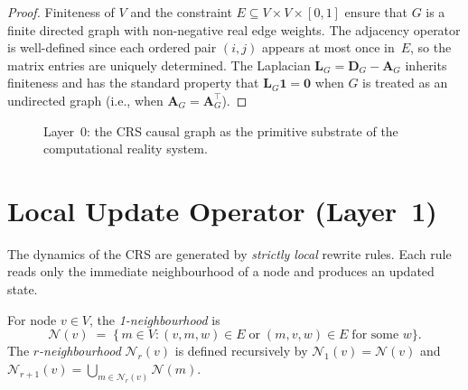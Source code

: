 \begin{proof}
Finiteness of $V$ and the constraint $E \subseteq V \times V \times
[0,1]$ ensure that $G$ is a finite directed graph with non-negative
real edge weights.  The adjacency operator is well-defined since each
ordered pair $(i,j)$ appears at most once in~$E$, so the matrix
entries are uniquely determined.  The Laplacian $\mathbf{L}_G =
\mathbf{D}_G - \mathbf{A}_G$ inherits finiteness and has the
standard property that $\mathbf{L}_G \mathbf{1} = \mathbf{0}$ when
$G$ is treated as an undirected graph (i.e., when
$\mathbf{A}_G = \mathbf{A}_G^\top$).
\end{proof}

\begin{figure}[t]
\centering
{}
\caption{Layer~0: the CRS causal graph as the primitive substrate
  of the computational reality system.}
\label{fig:c11:substrate}
\end{figure}

\section{Local Update Operator (Layer~1)}
\label{sec:ch11:rewrite}

The dynamics of the CRS are generated by \emph{strictly local} rewrite
rules.  Each rule reads only the immediate neighbourhood of a node and
produces an updated state.

\begin{definition}[Neighbourhood]
\label{def:11.5}
For node $v \in V$, the \emph{1-neighbourhood} is
\[
  \mathcal{N}(v) \;=\;
  \bigl\{\, m \in V : (v, m, w) \in E \;\text{or}\;
                       (m, v, w) \in E \;\text{for some } w \bigr\}.
\]
The \emph{$r$-neighbourhood} $\mathcal{N}_r(v)$ is defined recursively
by $\mathcal{N}_1(v) = \mathcal{N}(v)$ and $\mathcal{N}_{r+1}(v) =
\bigcup_{m \in \mathcal{N}_r(v)} \mathcal{N}(m)$.
\end{definition}


